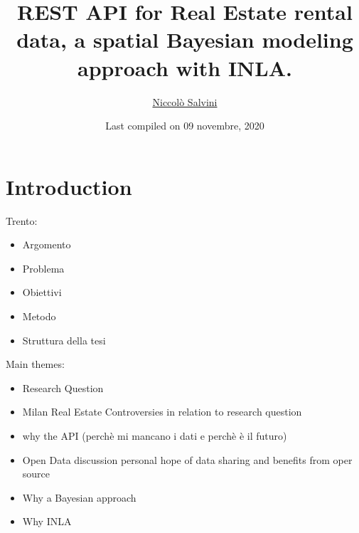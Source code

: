 \documentclass[
  12pt,
  a4paper,
  oneside]{book}
\title{REST API for Real Estate rental data, a spatial Bayesian modeling approach with INLA.}
\author{\href{https://niccolosalvini.netlify.app/}{Niccolò Salvini}}
\date{Last compiled on 09 novembre, 2020}
\providecommand{\tightlist}{%
  \setlength{\itemsep}{0pt}\setlength{\parskip}{0pt}}
\let\oldmaketitle\maketitle
\theoremstyle{definition}
\theoremstyle{definition}
\theoremstyle{definition}
\theoremstyle{remark}
\begin{document}
\maketitle


\newpage

\let\maketitle\oldmaketitle
\maketitle

{
\setcounter{tocdepth}{2}
\tableofcontents
}
\listoftables
\listoffigures
{}
\hypertarget{intro}{%
\chapter{Introduction}\label{intro}}

Trento:

\begin{itemize}
\tightlist
\item
  Argomento
\item
  Problema
\item
  Obiettivi
\item
  Metodo
\item
  Struttura della tesi
\end{itemize}

Main themes:

\begin{itemize}
\tightlist
\item
  Research Question
\item
  Milan Real Estate Controversies in relation to research question
\item
  why the API (perchè mi mancano i dati e perchè è il futuro)
\item
  Open Data discussion personal hope of data sharing and benefits from oper source
\item
  Why a Bayesian approach
\item
  Why INLA
\end{itemize}
\end{document}
